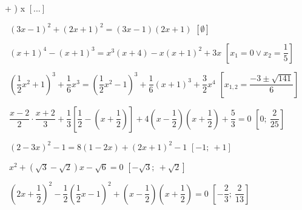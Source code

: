 \begin{esercizio}[*]
\begin{enumeratea}
+ \right) x\)
  \hfill\(\left[...\right]\)
 \item~\((3 x-1)^{2} + (2 x + 1)^{2} = (3 x-1) (2 x + 1)\)
  \hfill\(\left[\emptyset\right]\)
 \item~\((x + 1)^{4}-(x + 1)^{3} = x^{3} (x + 4)-x (x + 1)^{2} + 3 x\)
  \hfill\(\left[x_{1} = 0 \vee x_{2} = \dfrac{1}{5}\right]\)
 \item~\(\left(\dfrac{1}{2} x^{2} + 1 \right)^{3} + \dfrac{1}{6} x^{3} = 
\left(\dfrac{1}{2} x^{2}-1 \right)^{3} + \dfrac{1}{6} (x + 1)^{3} + 
\dfrac{3}{2} x^{4}\)
  \hfill\(\left[x_{1,2} = \dfrac{- 3 \pm \sqrt{141}}{6}\right]\)
 \item~\(\dfrac{x-2}{2} \cdot \dfrac{x + 2}{3} + \dfrac{1}{3} 
\left[\dfrac{1}{2}-\left(x + \dfrac{1}{2} \right) \right] + 4 \left(x 
-\dfrac{1}{2} 
\right) \left(x + \dfrac{1}{2} \right) + \dfrac{5}{3} = 0\)
  \hfill\(\left[0;~\dfrac{2}{25}\right]\)
 \item~\((2-3 x)^{2}-1 = 8 (1-2 x) + (2 x + 1)^{2}-1\)
  \hfill\(\left[-1;~+1\right]\)
 \item~\(x^{2} + \left(\sqrt{3}-\sqrt{2} \right) x-\sqrt{6} = 0\)
  \hfill\(\left[-\sqrt{3};~ + \sqrt{2}\right]\)
 \item~\(\left(2 x + \dfrac{1}{2} \right)^{2}-\dfrac{1}{2} 
        \left(\dfrac{1}{2} x-1 \right)^{2} + \left(x-\dfrac{1}{2} \right) 
        \left(x + \dfrac{1}{2} \right) = 0\)
  \hfill\(\left[-\dfrac{2}{3};~\dfrac{2}{13}\right]\)
 \end{enumeratea}
\end{esercizio}

